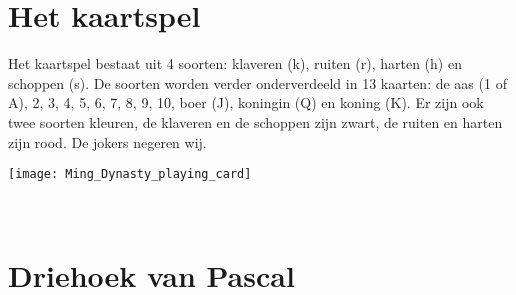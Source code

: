 \documentclass[12pt,a4paper,twoside]{article}
\begin{document}
\appendix
\section{Het kaartspel}
\vspace*{-1em}
\begin{minipage}[t][\paperheight]{.37\linewidth}
    \vspace*{.5em}
    Het kaartspel bestaat uit 4 soorten: klaveren (k), ruiten (r), harten (h) en schoppen (s). De soorten worden verder onderverdeeld in 13 kaarten: de aas (1 of A), 2, 3, 4, 5, 6, 7, 8, 9, 10, boer (J), koningin (Q) en koning (K). Er zijn ook twee soorten kleuren, de klaveren en de schoppen zijn zwart, de ruiten en harten zijn rood. De jokers negeren wij.
    \vfill
    \begin{center}
      \texttt{[image: Ming\_Dynasty\_playing\_card]}
    \end{center}
    \vfill\vfill
    \mbox\
\end{minipage}
\begin{minipage}[t]{.7\linewidth}
\end{minipage}


\cleardoublepage
\section{Driehoek van Pascal}
\end{document}
